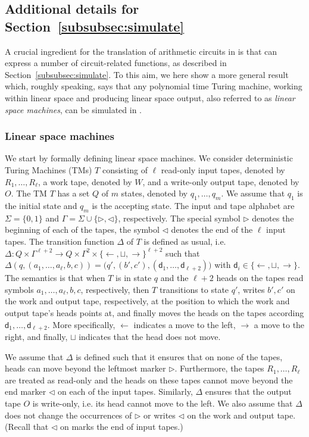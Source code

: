 \subsection{Additional details for Section~\ref{subsubsec:simulate}}
A crucial ingredient for the translation of arithmetic circuits in \langfor is that \langfor
can express a number of circuit-related functions, as described in Section~\ref{subsubsec:simulate}.
To this aim, we here show a more general result which, roughly speaking, says that any 
polynomial time Turing machine, working within linear space and producing linear space output, also
referred to as \textit{linear space machines}, 
can be simulated in \langfor. 


\subsubsection{Linear space machines}\label{subsubsec:linearspace}
We start by formally defining linear space machines. We consider  deterministic Turing Machines (TMs) $T$ 
consisting of $\ell$ read-only input tapes, denoted by $R_1,\ldots,R_\ell$,
a work tape, denoted by $W$, and a write-only output tape, denoted by $O$. The TM $T$ has a set 
$Q$ of $m$ states, denoted by $q_1,\ldots,q_m$. We assume that $q_1$ is the initial state and $q_m$ is the accepting state.
The input and tape alphabet are $\Sigma=\{0,1\}$ and $\Gamma=\Sigma\cup\{\rhd,\lhd\}$, respectively. The special 
symbol $\rhd$ denotes the beginning of each of the tapes, the symbol $\lhd$ denotes the end of the $\ell$ input tapes. 
The transition function $\Delta$ of $T$ is defined as usual, i.e. 
$\Delta:Q\times \Gamma^{\ell+2} \to Q\times \Gamma^{2}\times \{\leftarrow,\sqcup,\rightarrow\}^{\ell+2}$ 
such that $\Delta(q,(a_1,\ldots,a_{\ell},b,c))=\bigl(q',(b',c'),(\mathsf{d}_1,\ldots,\mathsf{d}_{\ell+2})\bigr)$
with $\mathsf{d}_i\in \{\leftarrow,\sqcup,\rightarrow\}$. The semantics is that when $T$ is in state $q$ and the $\ell+2$ 
heads on the tapes read symbols $a_1,\ldots,a_{\ell},b,c$, respectively, then $T$ transitions to state $q'$,
writes $b',c'$ on the work and output tape, respectively, at the position to which the work and output 
tape's heads points at, and finally moves the heads on the tapes according 
$\mathsf{d}_1,\ldots,\mathsf{d}_{\ell+2}$. More specifically, $\leftarrow$  indicates a move to the left, 
$\rightarrow$ a move to the right, and finally, $\sqcup$ indicates that the head does not move.

We assume that $\Delta$ is defined such that it ensures that on none of the tapes, heads can move beyond 
the leftmost marker $\rhd$. Furthermore, the tapes $R_1,\ldots,R_\ell$ are treated as read-only and the heads 
on these tapes cannot move beyond the end marker $\lhd$ on each of the input tapes. Similarly, $\Delta$ ensures that the output tape $O$ 
is write-only, i.e. its head cannot move to the left.  We also assume that $\Delta$ does not change the 
occurrences of $\rhd$ or writes $\lhd$ on the work and output tape. (Recall that $\lhd$ on marks the end
of input tapes.)

